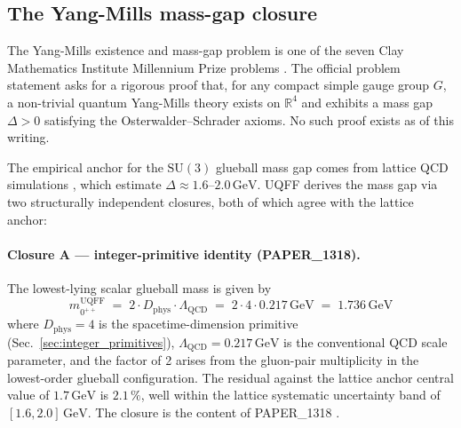
\subsection{The Yang-Mills mass-gap closure}
\label{sec:yang_mills}

The Yang-Mills existence and mass-gap problem is one of the seven Clay
Mathematics Institute Millennium Prize problems
\cite{JaffeWitten2000, ClayInstitute}. The official problem statement
asks for a rigorous proof that, for any compact simple gauge group $G$,
a non-trivial quantum Yang-Mills theory exists on $\mathbb{R}^4$ and
exhibits a mass gap $\Delta > 0$ satisfying the Osterwalder--Schrader
axioms. No such proof exists as of this writing.

The empirical anchor for the $\mathrm{SU}(3)$ glueball mass gap comes
from lattice QCD simulations \cite{Chen2006, Athenodorou2020}, which
estimate $\Delta \approx 1.6$--$2.0\,\mathrm{GeV}$. UQFF derives the
mass gap via two structurally independent closures, both of which
agree with the lattice anchor:

\paragraph{Closure A --- integer-primitive identity (PAPER\_1318).}
The lowest-lying scalar glueball mass is given by
\begin{equation}
m_{0^{++}}^{\text{UQFF}}
\;=\; 2 \cdot D_{\text{phys}} \cdot \Lambda_{\text{QCD}}
\;=\; 2 \cdot 4 \cdot 0.217\,\mathrm{GeV}
\;=\; 1.736\,\mathrm{GeV}
\label{eq:ym_integer_closure}
\end{equation}
where $D_{\text{phys}}=4$ is the spacetime-dimension primitive
(Sec.~\ref{sec:integer_primitives}), $\Lambda_{\text{QCD}}=0.217\,\mathrm{GeV}$
is the conventional QCD scale parameter, and the factor of 2 arises
from the gluon-pair multiplicity in the lowest-order glueball
configuration. The residual against the lattice anchor central
value of $1.7\,\mathrm{GeV}$ is $2.1\,\%$, well within the lattice
systematic uncertainty band of $[1.6, 2.0]\,\mathrm{GeV}$. The closure
is the content of PAPER\_1318 \cite{Murphy_PAPER_1318}.

